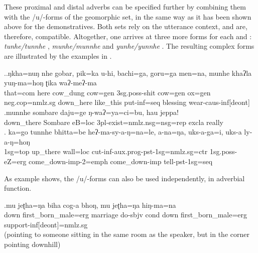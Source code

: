 These proximal and distal adverbs can be specified further by combining them with the /u/-forms of the geomorphic set, in the same way as it has been shown above for the demonstratives. Both sets rely on the utterance context, and are, therefore, compatible. Altogether, one arrives at three more forms for each   and : \emph{tunhe/tunnhe} , \emph{munhe/munnhe}  and \emph{yunhe/yunnhe} . The resulting complex forms are illustrated by the examples in \Next. 

\ex.\ag.\label{tikamunhe}ŋkha=nuŋ   nhe  gobar,   pik=ka    u-hi,    bachi=ga,        goru=ga    men=na,    munhe     khaʔla   yuŋ-ma=hoŋ      ʈika    waʔ-meʔ-ma  \\
that{\sc =com} here cow\_dung cow{\sc =gen} {\sc 3sg.poss-}shit cow{\sc =gen} ox{\sc =gen} {\sc neg.cop=nmlz.sg} down\_here like\_this put{\sc -inf=seq} blessing wear{\sc -caus-inf[deont]}\\
 
\bg.munnhe     sombare  daju=ge            ŋ-waʔ=ya=ci=bu,                      hau   jeppa!\\
down\_there Sombare eB{\sc =loc} {\sc 3pl-}exist{\sc =nmlz.nsg=nsg=rep} {\sc excla} really\\
 
\bg. ka=go      tunnhe   bhitta=be    heʔ-ma-sy-a-ŋ=na=le,   a-na=ŋa,     uks-a-ga=i,       uks-a ly-a-ŋ=hoŋ\\
{\sc 1sg=top} up\_there wall{\sc =loc} cut{\sc -inf-aux.prog-pst-1sg=nmlz.sg=ctr} {\sc 1sg.poss-}eZ{\sc =erg} come\_down{\sc -imp-2=emph} come\_down{\sc -imp} tell{\sc -pst-1sg=seq}\\
 

As example \Next shows, the /u/-forms can also be used independently, in adverbial function. 

\exg.mu     jeʈha=ŋa   biha     cog-a             bhoŋ, mu     jeʈha=ŋa            hiŋ-ma=na\\
down first\_born\_male{\sc =erg} marriage do{\sc [3sg]-sbjv} {\sc cond} down first\_born\_male{\sc =erg} support{\sc -inf[deont]=nmlz.sg}\\
 (pointing to someone sitting in the same room as the speaker, but in the corner pointing downhill) 


